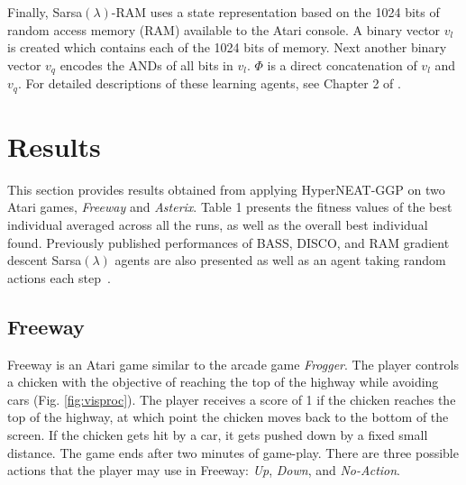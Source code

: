 \documentclass{sig-alternate}
\begin{document}
Finally, Sarsa$(\lambda)$-RAM uses a state representation based on the 1024 bits of random access memory (RAM) available to the Atari console. A binary vector $v_l$ is created which contains each of the 1024 bits of memory. Next another binary vector $v_q$ encodes the ANDs of all bits in $v_l$. $\Phi$ is a direct concatenation of $v_l$ and $v_q$. For detailed descriptions of these learning agents, see Chapter 2 of \cite{naddaf10}.

\section{Results}
\label{sec:results}
This section provides results obtained from applying HyperNEAT-GGP on two Atari games, \textit{Freeway} and \textit{Asterix}. Table 1 presents the fitness values of the best individual averaged across all the runs, as well as the overall best individual found. Previously published performances of BASS, DISCO, and RAM gradient descent Sarsa$(\lambda)$ agents are also presented as well as an agent taking random actions each step~\cite{naddaf10}. 

\subsection {Freeway}

Freeway is an Atari game similar to the arcade game \textit{Frogger}. The player controls a chicken with the objective of reaching the top of the highway while avoiding cars (Fig. \ref{fig:visproc}). The player receives a score of 1 if the chicken reaches the top of the highway, at which point the chicken moves back to the bottom of the screen. If the chicken gets hit by a car, it gets pushed down by a fixed small distance. The game ends after two minutes of game-play. There are three possible actions that the player may use in Freeway: \textit{Up}, \textit{Down}, and \textit{No-Action}.
\end{document}
